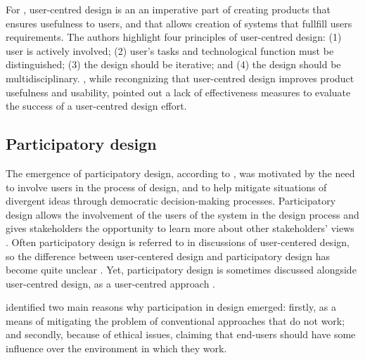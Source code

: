 \documentclass[preprint,12pt]{elsarticle}
\begin{document}
For \citet{vilpola2008method}, user-centred design is an an imperative part of creating products that ensures usefulness to users, and that allows creation of systems that fullfill users requirements. The authors highlight four principles of user-centred design: (1) user is actively involved; (2) user's tasks and technological function must be distinguished; (3) the design should be iterative; and (4) the design should be multidisciplinary. 
\citet{vredenberg2001user}, while recongnizing that user-centred design improves product usefulness and usability, pointed out a lack of effectiveness measures to evaluate the success of a user-centred design effort.

\subsection{Participatory design}
The emergence of participatory design, according to \citet{bannon2018introduction}, was motivated by the need to involve users in the process of design, and to help mitigate situations of divergent ideas through democratic decision-making processes. Participatory design allows the involvement of the users of the system in the design process and gives stakeholders the opportunity to learn more about other stakeholders' views \cite{unger2013designing}.
Often participatory design is referred to in discussions of user-centered design, so the difference between user-centered design and participatory design has become quite unclear \cite{bannon2018introduction}. Yet, participatory design is sometimes discussed alongside user-centred design, as a user-centred approach \cite{leng2018designing}.

\citet{dearnley1983favour}identified two main reasons why participation in design emerged: firstly, as a means of mitigating the problem of conventional approaches that do not work; and secondly, because of ethical issues, claiming that end-users should have some influence over the environment in which they work.
\end{document}
